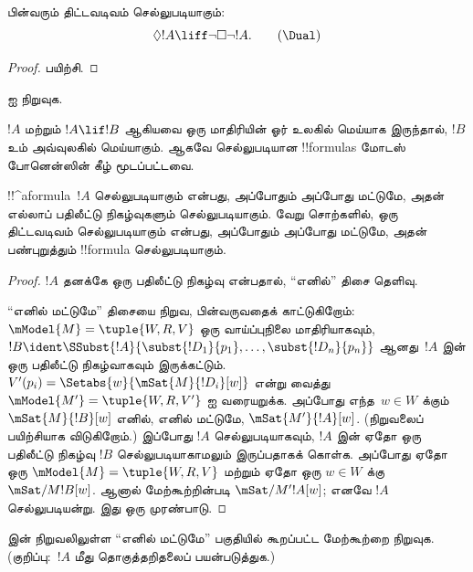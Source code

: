 \documentclass[../../../include/open-logic-section]{subfiles}
\begin{document}
\begin{prop}
  பின்வரும் திட்டவடிவம் \Dual{} செல்லுபடியாகும்:
  \begin{equation*}
  \Diamond !A \liff \lnot\Box\lnot !A. \tag{\Dual}
  \end{equation*}
\end{prop}

\begin{proof}
  பயிற்சி.
\end{proof}

\begin{prob}
   ஐ நிறுவுக.
\end{prob}

\begin{prop}
  $!A$ மற்றும் $!A \lif !B$ ஆகியவை ஒரு மாதிரியின் ஓர் உலகில் மெய்யாக
  இருந்தால், $!B$ உம் அவ்வுலகில் மெய்யாகும். ஆகவே செல்லுபடியான
  !!{formula}s மோடஸ் போனென்ஸின் கீழ் மூடப்பட்டவை.
\end{prop}

\begin{prop}
  !!^a{formula}~$!A$ செல்லுபடியாகும் என்பது, அப்போதும் அப்போது மட்டுமே,
  அதன் எல்லாப் பதிலீட்டு நிகழ்வுகளும் செல்லுபடியாகும். வேறு சொற்களில்,
  ஒரு திட்டவடிவம் செல்லுபடியாகும் என்பது, அப்போதும் அப்போது மட்டுமே, அதன்
  பண்புறுத்தும் !!{formula} செல்லுபடியாகும்.
\end{prop}

\begin{proof}
  $!A$ தனக்கே ஒரு பதிலீட்டு நிகழ்வு என்பதால், ``எனில்'' திசை தெளிவு.

  ``எனில் மட்டுமே'' திசையை நிறுவ, பின்வருவதைக் காட்டுகிறோம்:
  $\mModel{M} = \tuple{W, R, V}$ ஒரு வாய்ப்புநிலை மாதிரியாகவும்,
  $!B \ident
  \SSubst{!A}{\subst{!D_1}{p_1},\dots,\subst{!D_n}{p_n}}$ ஆனது~$!A$ இன்
  ஒரு பதிலீட்டு நிகழ்வாகவும் இருக்கட்டும். $V'(p_i) =
  \Setabs{w}{\mSat{M}{!D_i}[w]}$ என்று வைத்து $\mModel{M'} = \tuple{W,
  R, V'}$ ஐ வரையறுக்க. அப்போது எந்த~$w \in W$ க்கும்
  $\mSat{M}{!B}[w]$ எனில், எனில் மட்டுமே, $\mSat{M'}{!A}[w]$.
  (நிறுவலைப் பயிற்சியாக விடுகிறோம்.) இப்போது $!A$ செல்லுபடியாகவும்,
  $!A$ இன் ஏதோ ஒரு பதிலீட்டு நிகழ்வு $!B$ செல்லுபடியாகாமலும் இருப்பதாகக்
  கொள்க. அப்போது ஏதோ ஒரு
  $\mModel{M} = \tuple{W, R, V}$ மற்றும் ஏதோ ஒரு $w \in W$ க்கு
  $\mSat/{M}{!B}[w]$. ஆனால் மேற்கூற்றின்படி $\mSat/{M'}{!A}[w]$; எனவே
  $!A$ செல்லுபடியன்று. இது ஒரு முரண்பாடு.
\end{proof}

\begin{prob}
   இன் நிறுவலிலுள்ள ``எனில்
  மட்டுமே'' பகுதியில் கூறப்பட்ட மேற்கூற்றை நிறுவுக. (குறிப்பு:~$!A$ மீது
  தொகுத்தறிதலைப் பயன்படுத்துக.)
\end{prob}
\end{document}
